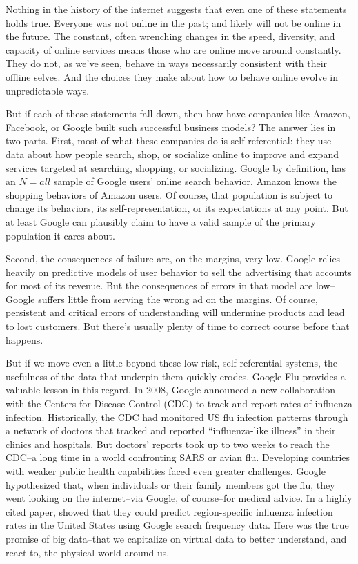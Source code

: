 \documentclass[12pt]{article}
\begin{document}
Nothing in the history of the internet suggests that even one of
these statements holds true. Everyone was not online in the past; and
likely will not be online in the future. The constant, often
wrenching changes in the speed, diversity, and capacity of online
services means those who are online move around constantly. They do
not, as we've seen, behave in ways necessarily consistent with their
offline selves. And the choices they make about how to behave online
evolve in unpredictable ways. 

But if each of these statements fall down, then how have companies
like Amazon, Facebook, or Google built such successful business
models? The answer lies in two parts. First, most of what these
companies do is self-referential: they use data about how people
search, shop, or socialize online to improve and expand services
targeted at searching, shopping, or socializing. Google by definition,
has an $N=all$ sample of Google users' online search
behavior. Amazon knows the shopping behaviors of Amazon users. Of
course, that population is subject to change its behaviors, its
self-representation, or its expectations at any point. But at least
Google can plausibly claim to have a valid sample of the primary
population it cares about. 

Second, the consequences of failure are, on the margins, very
low. Google relies heavily on predictive models of user behavior to
sell the advertising that accounts for most of its revenue. But the
consequences of errors in that model are low--Google suffers little
from serving the wrong ad on the margins. Of course, persistent and
critical errors of understanding will undermine products and lead to
lost customers. But there's usually plenty of time to correct course
before that happens. 

But if we move even a little beyond these low-risk, self-referential
systems, the usefulness of the data that underpin them quickly
erodes. Google Flu provides a valuable lesson in this regard. In 2008,
Google announced a new collaboration with the Centers for Disease
Control (CDC) to track and report rates of influenza
infection. Historically, the CDC had monitored US flu infection
patterns through a network of doctors that tracked and reported
``influenza-like illness'' in their clinics and hospitals. But
doctors' reports took up to two weeks to reach the CDC--a long time in
a world confronting SARS or avian flu. Developing countries with
weaker public health capabilities faced even greater
challenges. Google hypothesized that, when individuals or their family
members got the flu, they went looking on the internet--via Google, of
course--for medical advice. In a highly cited paper,
\cite{ginsberg2008detecting} showed that they could predict
region-specific influenza infection rates in the United States using
Google search frequency data. Here was the true promise of big
data--that we capitalize on virtual data to better understand, and
react to, the
physical world around us.
\end{document}
